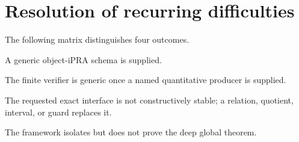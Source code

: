 \section{Resolution of recurring difficulties}
\label{sec:difficulties}

The following matrix distinguishes four outcomes.

\begin{description}[leftmargin=2.8cm]
\item[Resolved.] A generic object-iPRA schema is supplied.
\item[Conditional.] The finite verifier is generic once a named quantitative
  producer is supplied.
\item[Reformulated.] The requested exact interface is not constructively stable;
  a relation, quotient, interval, or guard replaces it.
\item[Open producer.] The framework isolates but does not prove the deep global
  theorem.
\end{description}

